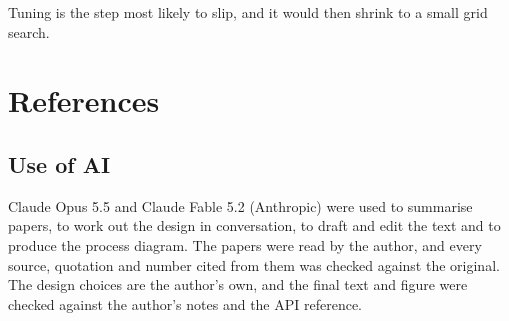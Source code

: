 \documentclass[11pt,a4paper]{article}
\begin{document}
Tuning is the step most likely to slip, and it would then shrink to a small grid search.

\section*{References}

{\sloppy\printbibliography[heading=none]}

\subsection*{Use of AI}
Claude Opus 5.5 and Claude Fable 5.2 (Anthropic) were used to summarise papers, to work out the design in conversation, to draft and edit the
text and to produce the process diagram. The papers were read by the author, and every source, quotation and
number cited from them was checked against the original. The design choices are the author's own, and the
final text and figure were checked against the author's notes and the API reference.
\end{document}
